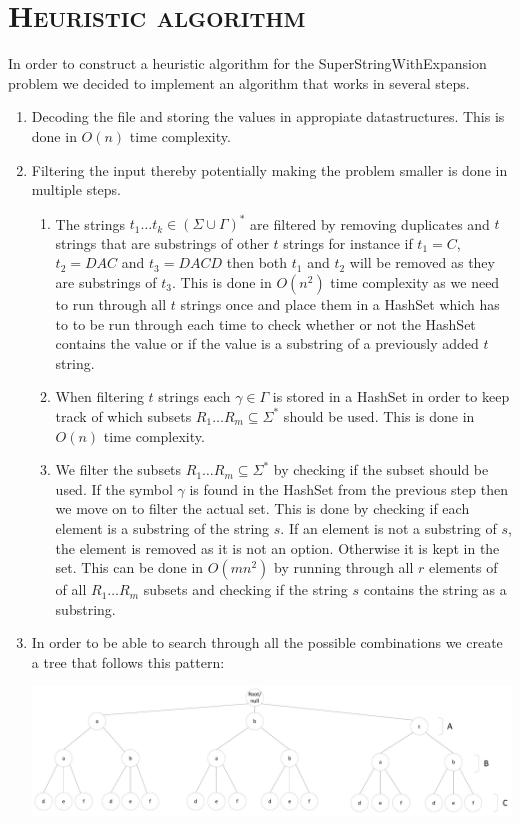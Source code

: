 \documentclass[paper=a4, fontsize=11pt]{scrartcl}
\numberwithin{equation}{section}		%
\numberwithin{figure}{section}			%
\numberwithin{table}{section}				%
\begin{document}
\section{\textsc{Heuristic algorithm}}
In order to construct a heuristic algorithm for the SuperStringWithExpansion problem we decided to implement an algorithm that works in several steps.
\begin{enumerate}
	\item
	Decoding the file and storing the values in appropiate datastructures. This is done in $O(n)$ time complexity.
	\item
	Filtering the input thereby potentially making the problem smaller is done in multiple steps.
	\begin{enumerate} 
		\item
		The strings $t_1\ldots t_k \in (\Sigma \cup \Gamma)^*$ are filtered by removing duplicates and $t$ strings that are substrings of other $t$ strings for instance if $t_1=C$, $t_2=DAC$ and $t_3=DACD$ then both $t_1$ and $t_2$ will be removed as they are substrings of $t_3$. This is done in $O(n^2)$ time complexity as we need to run through all $t$ strings once and place them in a HashSet which has to to be run through each time to check whether or not the HashSet contains the value or if the value is a substring of a previously added $t$ string.
		\item
		When filtering $t$ strings each $\gamma \in \mathcal{\Gamma}$ is stored in a HashSet in order to keep track of which subsets $R_1\ldots R_m \subseteq \Sigma^*$ should be used. This is done in $O(n)$ time complexity.
		\item
		We filter the subsets $R_1\ldots R_m \subseteq \Sigma^*$ by checking if the subset should be used. If the symbol $\gamma$ is found in the HashSet from the previous step then we move on to filter the actual set. This is done by checking if each element is a substring of the string $s$. If an element is not a substring of $s$, the element is removed as it is not an option. Otherwise it is kept in the set. This can be done in $O(mn^2)$ by running through all $r$ elements of of all $R_1\ldots R_m$ subsets and checking if the string $s$ contains the string as a substring.
	\end{enumerate}
	\item
	In order to be able to search through all the possible combinations we create a tree that follows this pattern:\par
	\includegraphics[width=1\textwidth]{imgs/Tree.pdf}

\end{enumerate}
\end{document}
